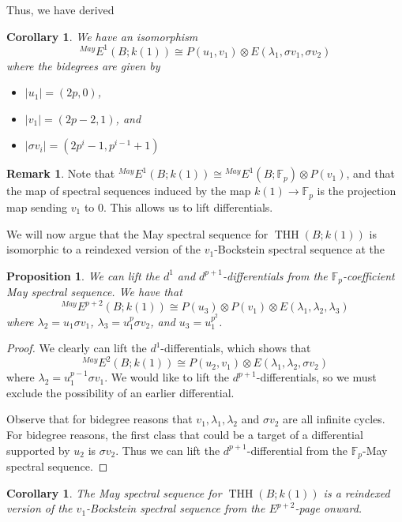 \documentclass[12pt]{amsart}
\newcommand{\F}{\mathbb{F}}
\DeclareMathOperator{\THH}{THH}
\newcommand{\MayE}{\mbox{}^{May}E}
\newtheorem{cor}[equation]{Corollary}
\newtheorem{prop}[equation]{Proposition}
\theoremstyle{definition}
\newtheorem{rmk}[equation]{Remark}
\numberwithin{equation}{section}
\numberwithin{figure}{section}
\begin{document}
Thus, we have derived 

\begin{cor}
	We have an isomorphism
	\[
	\mbox{}^{May}E^1(B;k(1))\cong P(u_1, v_1)\otimes E(\lambda_1, \sigma v_1, \sigma v_2)
	\]
	where the bidegrees are given by 
	\begin{itemize}
		\item $|u_1| = (2p,0)$, 
		\item $|v_1| = (2p-2,1)$, and
		\item $|\sigma v_i| = (2p^i-1,p^{i-1}+1)$
	\end{itemize}
\end{cor}

\begin{rmk}
	Note that $\mbox{}^{May}E^1(B;k(1))\cong \mbox{}^{May}E^1(B;\F_p)\otimes P(v_1)$, and that the map of spectral sequences induced by the map $k(1)\to \F_p$ is the projection map sending $v_1$ to 0. This allows us to lift differentials. 
\end{rmk}

We will now argue that the May spectral sequence for $\THH(B;k(1))$ is isomorphic to a reindexed version of the $v_1$-Bockstein spectral sequence at the 

\begin{prop}
	We can lift the $d^1$ and $d^{p+1}$-differentials from the $\F_p$-coefficient May spectral sequence. We have that 
	\[
	\MayE^{p+2}(B;k(1))\cong P(u_3)\otimes P(v_1)\otimes E(\lambda_1, \lambda_2, \lambda_3)
	\]
	where $\lambda_2 = u_1\sigma v_1$, $\lambda_3 = u_1^p\sigma v_2$, and $u_3 = u_1^{p^2}$. 
\end{prop}
\begin{proof}
	We clearly can lift the $d^1$-differentials, which shows that 
	\[
	\MayE^2(B; k(1))\cong P(u_2,v_1)\otimes E(\lambda_1, \lambda_2, \sigma v_2)
	\]
	where $\lambda_2 = u_1^{p-1}\sigma v_1$. We would like to lift the $d^{p+1}$-differentials, so we must exclude the possibility of an earlier differential. 
	
	Observe that for bidegree reasons that $v_1, \lambda_1, \lambda_2$ and $\sigma v_2$ are all infinite cycles. For bidegree reasons, the first class that could be a target of a differential supported by $u_2$ is $\sigma v_2$. Thus we can lift the $d^{p+1}$-differential from the $\F_p$-May spectral sequence. 
\end{proof}

\begin{cor}
	The May spectral sequence for $\THH(B;k(1))$ is a reindexed version of the $v_1$-Bockstein spectral sequence from the $E^{p+2}$-page onward. 
\end{cor}
\end{document}
